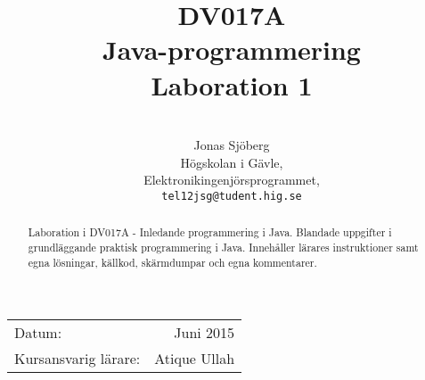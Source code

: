 \documentclass[11pt,a4paper]{article}
\title{DV017A \\ Java-programmering \\ Laboration 1}
\author{\\
  Jonas Sjöberg\\
  Högskolan i Gävle,\\
  Elektronikingenjörsprogrammet,\\
  \texttt{tel12jsg@tudent.hig.se}
}
\date{}
\begin{document}
    \maketitle

    \begin{center}
    \begin{tabular}{l r}
        Datum: & Juni 2015 \\
        Kursansvarig lärare: & Atique Ullah
    \end{tabular}
    \end{center}

    \begin{abstract}
        Laboration i DV017A - Inledande programmering i Java. Blandade uppgifter i grundläggande praktisk programmering i Java. Innehåller lärares instruktioner samt egna lösningar, källkod, skärmdumpar och egna kommentarer.
    \end{abstract}

    \newpage
    \setcounter{tocdepth}{3}
    \tableofcontents
    \newpage

%   
    
    
    
    
    
    
    
    
    
    
%   

    \newpage

    
\end{document}
